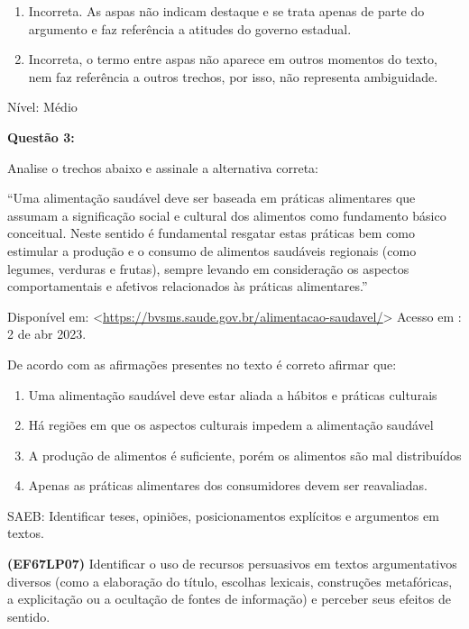 {\begin{enumerate}
\def\labelenumi{\arabic{enumi}.}
\item
  Incorreta. As aspas não indicam destaque e se trata apenas de parte do
  argumento e faz referência a atitudes do governo estadual.
\item
  Incorreta, o termo entre aspas não aparece em outros momentos do
  texto, nem faz referência a outros trechos, por isso, não representa
  ambiguidade.
\end{enumerate}

Nível: Médio

\textbf{Questão 3:}

Analise o trechos abaixo e assinale a alternativa correta:

``Uma alimentação saudável deve ser baseada em práticas alimentares que
assumam a significação social e cultural dos alimentos como fundamento
básico conceitual. Neste sentido é fundamental resgatar estas práticas
bem como estimular a produção e o consumo de alimentos saudáveis
regionais (como legumes, verduras e frutas), sempre levando em
consideração os aspectos comportamentais e afetivos relacionados às
práticas alimentares.''

Disponível em:
\textless{}\href{https://bvsms.saude.gov.br/alimentacao-saudavel/}{\uline{https://bvsms.saude.gov.br/alimentacao-saudavel/}}\textgreater{}
Acesso em : 2 de abr 2023.

De acordo com as afirmações presentes no texto é correto afirmar que:

\begin{enumerate}
\def\labelenumi{\alph{enumi})}
\item
  Uma alimentação saudável deve estar aliada a hábitos e práticas
  culturais
\item
  Há regiões em que os aspectos culturais impedem a alimentação saudável
\item
  A produção de alimentos é suficiente, porém os alimentos são mal
  distribuídos
\item
  Apenas as práticas alimentares dos consumidores devem ser reavaliadas.
\end{enumerate}

SAEB: Identificar teses, opiniões, posicionamentos explícitos e
argumentos em textos.

\textbf{(EF67LP07)} Identificar o uso de recursos persuasivos em textos
argumentativos diversos (como a elaboração do título, escolhas lexicais,
construções metafóricas, a explicitação ou a ocultação de fontes de
informação) e perceber seus efeitos de sentido.

}
